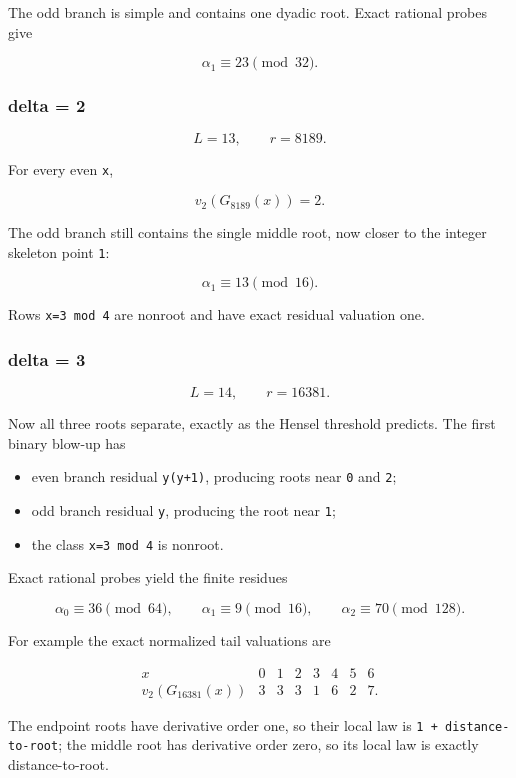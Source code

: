\documentclass[11pt,letterpaper]{article}
\providecommand{\tightlist}{\setlength{\itemsep}{0pt}\setlength{\parskip}{0pt}}
\begin{document}
The odd branch is simple and contains one dyadic root. Exact rational probes give

\[
\alpha_1\equiv23\pmod{32}.
\]

\subsubsection{delta = 2}\label{delta-2}

\[
L=13,
\qquad
r=8189.
\]

For every even \texttt{x},

\[
\boxed{v_2(G_{8189}(x))=2.}
\]

The odd branch still contains the single middle root, now closer to the integer skeleton point \texttt{1}:

\[
\alpha_1\equiv13\pmod{16}.
\]

Rows \texttt{x=3\ mod\ 4} are nonroot and have exact residual valuation one.

\subsubsection{delta = 3}\label{delta-3}

\[
L=14,
\qquad
r=16381.
\]

Now all three roots separate, exactly as the Hensel threshold predicts. The first binary blow-up has

\begin{itemize}
\tightlist
\item
  even branch residual \texttt{y(y+1)}, producing roots near \texttt{0} and \texttt{2};
\item
  odd branch residual \texttt{y}, producing the root near \texttt{1};
\item
  the class \texttt{x=3\ mod\ 4} is nonroot.
\end{itemize}

Exact rational probes yield the finite residues

\[
\boxed{
\alpha_0\equiv36\pmod{64},
\qquad
\alpha_1\equiv9\pmod{16},
\qquad
\alpha_2\equiv70\pmod{128}.
}
\]

For example the exact normalized tail valuations are

\[
\begin{array}{c|ccccccc}
x&0&1&2&3&4&5&6\\ \hline
v_2(G_{16381}(x))&3&3&3&1&6&2&7.
\end{array}
\]

The endpoint roots have derivative order one, so their local law is \texttt{1\ +\ distance-to-root}; the middle root has derivative order zero, so its local law is exactly distance-to-root.
\end{document}
